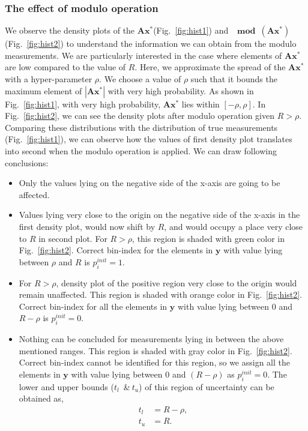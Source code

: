 \subsubsection{The effect of modulo operation} 
\label{sec:modeff}
We observe the density plots of the $\mathbf{Ax^*}$(Fig.~\ref{fig:hist1}) and $\mathbf{\mod(\mathbf{Ax^*})}$(Fig.~\ref{fig:hist2}) to understand the information we can obtain from the modulo measurements. We are particularly interested in the case where elements of $\mathbf{Ax^*}$ are low compared to the value of $R$. Here, we approximate the spread of the $\mathbf{Ax^*}$ with a hyper-parameter $\rho$. We choose a value of $\rho$ such that it bounds the maximum element of $|\mathbf{Ax^*}|$ with very high probability. As shown in Fig.~\ref{fig:hist1}, with very high probability, $\mathbf{Ax^*}$ lies within $[-\rho, \rho]$. %
In Fig.~\ref{fig:hist2}, we can see the density plots after modulo operation given $R>\rho$. Comparing these distributions with the distribution of true measurements (Fig.~\ref{fig:hist1}), we can observe how the values of first density plot translates into second when the modulo operation is applied. We can draw following conclusions:
\begin{itemize}
	\item Only the values lying on the negative side of the x-axis are going to be affected.
	\item Values lying very close to the origin on the negative side of the x-axis in the first density plot, would now shift by $R$, and would occupy a place very close to $R$ in second plot. For $R>\rho$, this region is shaded with green color in Fig.~\ref{fig:hist2}. Correct bin-index for the elements in $\mathbf{y}$ with value lying between $\rho$ and $R$ is $p^{init}_{i} = 1$.
	\item For $R>\rho$, density plot of the positive region very close to the origin would remain unaffected. This region is shaded with orange color in Fig.~\ref{fig:hist2}. Correct bin-index for all the elements in $\mathbf{y}$ with value lying between $0$ and $R-\rho$ is $p^{init}_{i} = 0$.
	\item Nothing can be concluded for measurements lying in between the above mentioned ranges. This region is shaded with gray color in Fig.~\ref{fig:hist2}. Correct bin-index cannot be identified for this region, so we assign all the elements in $\mathbf{y}$ with value lying between $0$ and $(R-\rho)$ as $p^{init}_{i} = 0$. The lower and upper bounds ($t_l$~\&$~t_u$) of this region of uncertainty can be obtained as, 
	\begin{align*}
	t_l & = R-\rho, \\
	t_u & = R.
	\end{align*}
\end{itemize}

